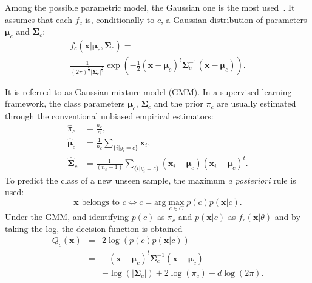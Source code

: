 \documentclass[journal]{IEEEtran}
\begin{document}
    Among the possible parametric model,  the Gaussian one is the most
    used~\cite{bouveyron2014model}.   It assumes  that each  $f_c$ is,
    conditionally  to  $c$,  a  Gaussian  distribution  of  parameters
    $\boldsymbol{\mu}_c$    and    $\boldsymbol{\Sigma}_c$:
    \begin{multline}
        f_c(\mathbf{x}|\boldsymbol{\mu}_c, \boldsymbol{\Sigma}_c) = \\ \frac{1}{(2\pi)^{\frac{d}{2}} |\boldsymbol{\Sigma}_c|^{\frac{1}{2}}} \exp \left( -\frac{1}{2} (\mathbf{x} - \boldsymbol{\mu}_c)^t \boldsymbol{\Sigma}_c^{-1} (\mathbf{x} - \boldsymbol{\mu}_c) \right).
    \end{multline}

    It  is  referred  to  as  Gaussian  mixture  model  (GMM).   In  a
    supervised    learning    framework,    the    class    parameters
    $\boldsymbol{\mu}_c$,   $\boldsymbol{\Sigma}_c$   and  the   prior
    $\pi_c$ are  usually estimated  through the  conventional unbiased
    empirical estimators:
    \begin{align}
        \hat{\pi}_c &= \frac{n_c}{n},\\
        \hat{\boldsymbol{\mu}}_c &= \frac{1}{n_c} \sum_{\{i|y_i = c\}} \mathbf{x}_i ,\\
        \hat{\boldsymbol{\Sigma}}_c &= \frac{1}{(n_c - 1)} \sum_{\{i|y_i = c\}} (\mathbf{x}_i - \boldsymbol{\mu}_c) (\mathbf{x}_i - \boldsymbol{\mu}_c)^t.
    \end{align}
    To predict the  class of a new unseen sample,  the maximum \emph{a
      posteriori}  rule  is  used:
    \begin{equation*}
        \mathbf{x} \text{ belongs to } c \Leftrightarrow c = \text{arg} \max_{c \in C} p(c) p(\mathbf{x}|c).
    \end{equation*}
    Under the GMM,  and identifying $p(c)$ as $\pi_c$  and $p(\mathbf{x}|c)$ as
    $f_c(\mathbf{x}|\theta)$ and by taking the log, the decision function is obtained
    \begin{eqnarray}\label{eq:decision}
      Q_c(\mathbf{x}) &=& 2 \log \left( p(c) p(\mathbf{x}|c) \right) \nonumber \\
                      &=& - (\mathbf{x} - \boldsymbol{\mu}_c)^t \boldsymbol{\Sigma}_c^{-1} (\mathbf{x} - \boldsymbol{\mu}_c) \nonumber \\
                      & &-\log (|\boldsymbol{\Sigma}_c|) + 2 \log (\pi_c) - d \log (2\pi).
    \end{eqnarray}
\end{document}
